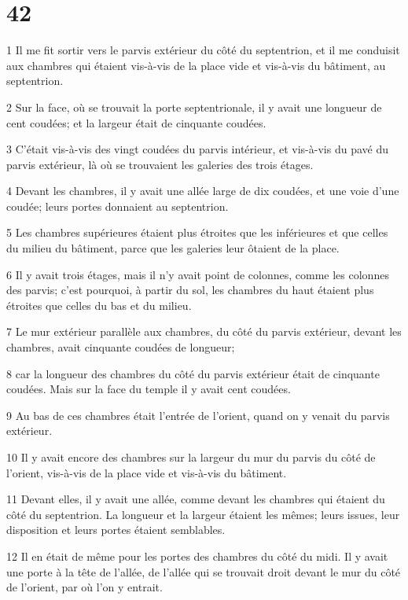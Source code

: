 \chapter{42}

\par 1 Il me fit sortir vers le parvis extérieur du côté du septentrion, et il me conduisit aux chambres qui étaient vis-à-vis de la place vide et vis-à-vis du bâtiment, au septentrion.
\par 2 Sur la face, où se trouvait la porte septentrionale, il y avait une longueur de cent coudées; et la largeur était de cinquante coudées.
\par 3 C'était vis-à-vis des vingt coudées du parvis intérieur, et vis-à-vis du pavé du parvis extérieur, là où se trouvaient les galeries des trois étages.
\par 4 Devant les chambres, il y avait une allée large de dix coudées, et une voie d'une coudée; leurs portes donnaient au septentrion.
\par 5 Les chambres supérieures étaient plus étroites que les inférieures et que celles du milieu du bâtiment, parce que les galeries leur ôtaient de la place.
\par 6 Il y avait trois étages, mais il n'y avait point de colonnes, comme les colonnes des parvis; c'est pourquoi, à partir du sol, les chambres du haut étaient plus étroites que celles du bas et du milieu.
\par 7 Le mur extérieur parallèle aux chambres, du côté du parvis extérieur, devant les chambres, avait cinquante coudées de longueur;
\par 8 car la longueur des chambres du côté du parvis extérieur était de cinquante coudées. Mais sur la face du temple il y avait cent coudées.
\par 9 Au bas de ces chambres était l'entrée de l'orient, quand on y venait du parvis extérieur.
\par 10 Il y avait encore des chambres sur la largeur du mur du parvis du côté de l'orient, vis-à-vis de la place vide et vis-à-vis du bâtiment.
\par 11 Devant elles, il y avait une allée, comme devant les chambres qui étaient du côté du septentrion. La longueur et la largeur étaient les mêmes; leurs issues, leur disposition et leurs portes étaient semblables.
\par 12 Il en était de même pour les portes des chambres du côté du midi. Il y avait une porte à la tête de l'allée, de l'allée qui se trouvait droit devant le mur du côté de l'orient, par où l'on y entrait.
